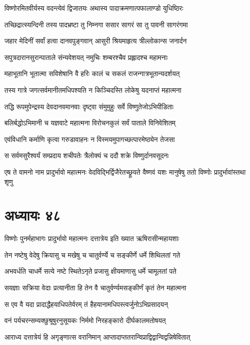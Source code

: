 \twolineshloka
{विष्णोरमितवीर्यस्य वदन्त्येवं द्विजातयः}
{अथास्य पादाक्रमणात्पफालाण्डो युधिष्ठिरः}


\twolineshloka
{तच्छिद्रात्स्यन्दिनी तस्य पादभ्रष्टा तु निम्नगा}
{ससार सागरं सा तु पावनी सागरंगमा}


\twolineshloka
{जहार मेदिनीं सर्वां हत्वा दानवपुङ्गवान्}
{आसुरी श्रियमाहृत्य त्रील्लोकान्स जनार्दन}


\twolineshloka
{सपुत्रदारानसुरान्पाताले संन्यवेशयत्}
{नमुचिः शम्बरश्चैव प्रह्लादश्च महामनाः}


\twolineshloka
{महाभूतानि भूतात्मा सविशेषानि वै हरिः}
{कालं च सकलं राजन्गात्रभूतान्यदर्शयत्}


\twolineshloka
{तस्य गात्रे जगत्सर्वमानीतमधिपश्यति}
{न किञ्चिदस्ति लोकेषु यदनाप्तं महात्मना}


\twolineshloka
{तद्धि रूपमुपेन्द्रस्य देवदानवमानवाः}
{दृष्ट्वा संमुमुहुः सर्वे विष्णुतेजोऽभिपीडिताः}


\twolineshloka
{बलिर्बद्धोऽभिमानी च यज्ञवाटे महात्मना}
{विरोचनकुलं सर्वं पाताले विनिवेशितम्}


\twolineshloka
{एवंविधानि कर्माणि कृत्वा गरुडावाहनः}
{न विस्मयमुपागच्छत्पारमेष्ठ्येन तेजसा}


\twolineshloka
{स सर्वमसुरैश्वर्यं सम्प्रदाय शचीपतेः}
{त्रैलोक्यं च ददौ शक्रे विष्णुर्दानवसूदनः}


\threelineshloka
{एष ते वामनो नाम प्रादुर्भावो महात्मनः}
{वेदविद्भिर्द्विजैरेतच्छ्रूयते वैष्णवं यशः}
{मानुषेषु ततो विष्णोः प्रादुर्भावांस्तथा शृणु}


\chapter{अध्यायः ४८}
\twolineshloka
{विष्णोः पुनर्महाभागः प्रादुर्भावो महात्मनः}
{दत्तात्रेय इति ख्यात ऋषिरासीन्महायशाः}


\twolineshloka
{तेन नष्टेषु वेदेषु क्रियासु च मखेषु च}
{चातुर्वर्ण्ये च सङ्कीर्णे धर्मे शिथिलतां गते}


\twolineshloka
{अभवर्धति चाधर्मे सत्ये नष्टे स्थितेऽनृते}
{प्रजासु क्षीयमाणासु धर्मे चामूलतां पते}


\twolineshloka
{सयज्ञाः सक्रिया वेदाः प्रत्यानीता हि तेन वै}
{चातुर्वर्ण्यमसङ्कीर्णं कृतं तेन महात्मना}


\twolineshloka
{स एव वै यदा प्रादाद्धैहयाधिपतेर्वरम्}
{तं हैहयानामधिपस्त्वर्जुनोऽभिप्रसादयन्}


\twolineshloka
{वनं पर्यचरन्सम्यक्छुश्रूषुरनुसूयकः}
{निर्ममो निरहङ्कारो दीर्घकालमतोषयत्}


\twolineshloka
{आराध्य दत्तात्रेयं हि अगृङ्णात्स वरानिमान्}
{आप्तादाप्ततरान्विप्राद्विद्वान्विद्वन्निषेवितात्}


